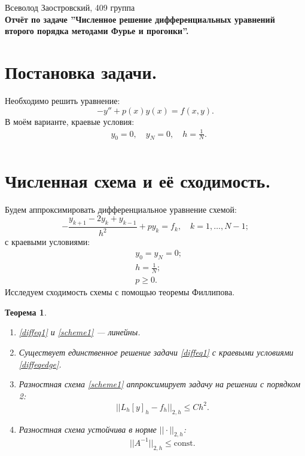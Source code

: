 \documentclass[14pt,a4paper]{extarticle}
\newtheorem{theorem}{Теорема} %
\newcommand{\1}{\mathbbm{1}}
\begin{document}
\begin{center}

    {Всеволод Заостровский, 409 группа}\\
    {\bfseries Отчёт по задаче ''Численное решение дифференциальных уравнений второго порядка методами Фурье и прогонки''.\\}
    \vspace{1cm}

\end{center}

\section{Постановка задачи.} Необходимо решить уравнение:
\begin{equation} \label{diffeq1}
    -y'' + p(x) y(x) = f(x, y).
\end{equation}
В моём варианте, краевые условия:
\begin{align} \label{diffeqedge}
    & y_0 = 0, \quad y_N = 0, \quad h = \frac{1}{N}. \\
\end{align}

\section{Численная схема и её сходимость.}

Будем аппроксимировать дифференциальное уравнение схемой:
\begin{equation} \label{scheme1}
    -\frac{y_{k+1} - 2 y_k + y_{k-1}}{h^2} + p y_k = f_k, \quad k = 1, \ldots, N - 1;
\end{equation}
с краевыми условиями:
\begin{align} \label{schemeedge}
    & y_0 = y_N = 0; \\
    & h = \frac{1}{N}; \\
    & p \geq 0.
\end{align}
Исследуем сходимость схемы с помощью теоремы Филлипова.
\begin{theorem}
    \begin{enumerate}
        \item \eqref{diffeq1} и \eqref{scheme1} --- линейны.
        \item Существует единственное решение задачи \eqref{diffeq1} с краевыми условиями \eqref{diffeqedge}.
        \item Разностная схема \eqref{scheme1} аппроксимирует задачу на решении с порядком 2:
            \begin{equation*}
                || L_h [y]_h - f_h || _{2, h} \leq C h^2.           
            \end{equation*}
        \item Разностная схема устойчива в норме $||\cdot||_{2,h}$:
        \begin{equation*}
            || A^{-1} ||_{2,h} \leq \text{const}.
        \end{equation*}
    \end{enumerate}
\end{theorem}
\end{document}
